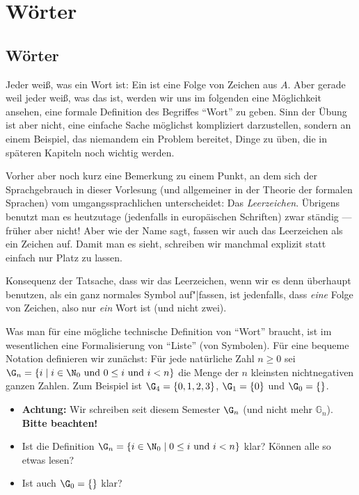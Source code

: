 \Tut\chapter{W\"orter}
\label{k:woerter}

\Tut\section{W\"orter}

Jeder weiß, was ein Wort ist: Ein  ist eine Folge von Zeichen aus $A$.  Aber gerade
weil jeder weiß, was das ist, werden wir uns im folgenden eine
Möglichkeit ansehen, eine formale Definition des Begriffes "`Wort"' zu
geben. Sinn der Übung ist aber nicht, eine einfache Sache möglichst
kompliziert darzustellen, sondern an einem Beispiel, das niemandem ein
Problem bereitet, Dinge zu üben, die in späteren Kapiteln noch
wichtig werden.

Vorher aber noch kurz eine Bemerkung zu einem Punkt, an dem sich der
Sprachgebrauch in dieser Vorlesung (und allgemeiner in der Theorie der
formalen Sprachen) vom umgangssprachlichen unterscheidet: Das
\emph{Leerzeichen}.  Übrigens benutzt man es heutzutage (jedenfalls
\zB in europäischen Schriften) zwar ständig --- früher aber nicht!
Aber wie der Name sagt, fassen wir auch das Leerzeichen als ein
Zeichen auf. Damit man es sieht, schreiben wir manchmal explizit
 statt einfach nur Platz zu lassen.

Konsequenz der Tatsache, dass wir das Leerzeichen, wenn wir es denn
überhaupt benutzen, als ein ganz normales Symbol auf"|fassen, ist
jedenfalls, dass \zB {}
\emph{eine} Folge von Zeichen, also nur \emph{ein} Wort ist (und nicht
zwei).

Was man für eine mögliche technische Definition von "`Wort"' braucht,
ist im wesentlichen eine Formalisierung von "`Liste"' (von Symbolen).
Für eine bequeme Notation definieren wir zunächst: Für jede natürliche
Zahl $n\geq 0$ sei
$\G_n = \{i\mid i\in \N_0 \text{ und } 0\leq i \text{ und } i< n\}$
die Menge der $n$ kleinsten nichtnegativen ganzen Zahlen. Zum Beispiel
ist $\G_4=\{0,1,2,3\}$, $\G_1=\{0\}$ und $\G_0=\{\}$.
%
\begin{tutorium}
  \begin{itemize}
  \item \textbf{Achtung:} Wir schreiben seit diesem Semester $\G_n$
    (und nicht mehr $\mathbb{G}_n$). \textbf{Bitte beachten!}
  \item Ist die Definition $\G_n= \{i\in \N_0 \mid 0\leq i  \text{ und }  i<
    n\}$ klar? Können alle so etwas lesen?
  \item Ist auch $\G_0=\{\}$ klar?
  \end{itemize}
\end{tutorium}

